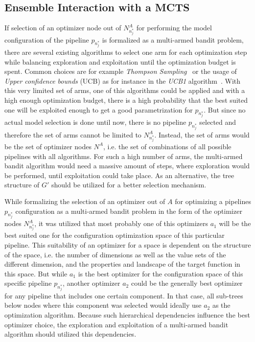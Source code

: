 \subsection{Ensemble Interaction with a MCTS}
\label{sec:appraoch:selection:mcts}
If selection of an optimizer node out of $N^A_{n^*_j}$ for performing the model configuration of the pipeline $p_{n^*_j}$ is formalized as a multi-armed bandit problem, there are several existing algorithms to select one arm for each optimization step while balancing exploration and exploitation until the optimization budget is spent.
Common choices are for example \textit{Thompson Sampling}~\cite{Thompson-Sampling} or the usage of \textit{Upper confidence bounds} (UCB) as for instance in the \textit{UCB1} algorithm~\cite{Auer-UCB1}.\newline
With this very limited set of arms, one of this algorithms could be applied and with a high enough optimization budget, there is a high probability that the best suited one will be exploited enough to get a good parametrization for $p_{n^*_j}$.
But since no actual model selection is done until now, there is no pipeline $p_{n^*_j}$ selected and therefore the set of arms cannot be limited to $N^A_{n^*_j}$.
Instead, the set of arms would be the set of optimizer nodes $N^A$, i.e. the set of combinations of all possible pipelines with all algorithms.\newline
For such a high number of arms, the multi-armed bandit algorithm would need a massive amount of steps, where exploration would be performed, until exploitation could take place.
As an alternative, the tree structure of $G'$ should be utilized for a better selection mechanism.

While formalizing the selection of an optimizer out of $A$ for optimizing a pipelines $p_{n^*_j}$ configuration as a multi-armed bandit problem in the form of the optimizer nodes $N^A_{n^*_j}$, it was utilized that most probably one of this optimizers $a_1$ will be the best suited one for the configuration optimization space of this particular pipeline.
This suitability of an optimizer for a space is dependent on the structure of the space, i.e. the number of dimensions as well as the value sets of the different dimension, and the properties and landscape of the target function in this space.\newline
But while $a_1$ is the best optimizer for the configuration space of this specific pipeline $p_{n^*_j}$, another optimizer $a_2$ could be the generally best optimizer for any pipeline that includes one certain component.
In that case, all sub-trees below nodes where this component was selected would ideally use $a_2$ as the optimization algorithm.
Because such hierarchical dependencies influence the best optimizer choice, the exploration and exploitation of a multi-armed bandit algorithm should utilized this dependencies.

